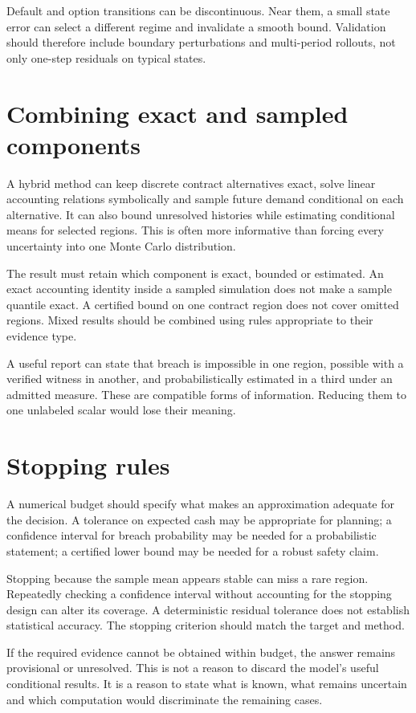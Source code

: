 Default and option transitions can be discontinuous. Near them, a small state error can select a different regime and invalidate a smooth bound. Validation should therefore include boundary perturbations and multi-period rollouts, not only one-step residuals on typical states.

\section{Combining exact and sampled components}
A hybrid method can keep discrete contract alternatives exact, solve linear accounting relations symbolically and sample future demand conditional on each alternative. It can also bound unresolved histories while estimating conditional means for selected regions. This is often more informative than forcing every uncertainty into one Monte Carlo distribution.

The result must retain which component is exact, bounded or estimated. An exact accounting identity inside a sampled simulation does not make a sample quantile exact. A certified bound on one contract region does not cover omitted regions. Mixed results should be combined using rules appropriate to their evidence type.

A useful report can state that breach is impossible in one region, possible with a verified witness in another, and probabilistically estimated in a third under an admitted measure. These are compatible forms of information. Reducing them to one unlabeled scalar would lose their meaning.

\section{Stopping rules}
A numerical budget should specify what makes an approximation adequate for the decision. A tolerance on expected cash may be appropriate for planning; a confidence interval for breach probability may be needed for a probabilistic statement; a certified lower bound may be needed for a robust safety claim.

Stopping because the sample mean appears stable can miss a rare region. Repeatedly checking a confidence interval without accounting for the stopping design can alter its coverage. A deterministic residual tolerance does not establish statistical accuracy. The stopping criterion should match the target and method.

If the required evidence cannot be obtained within budget, the answer remains provisional or unresolved. This is not a reason to discard the model's useful conditional results. It is a reason to state what is known, what remains uncertain and which computation would discriminate the remaining cases.

